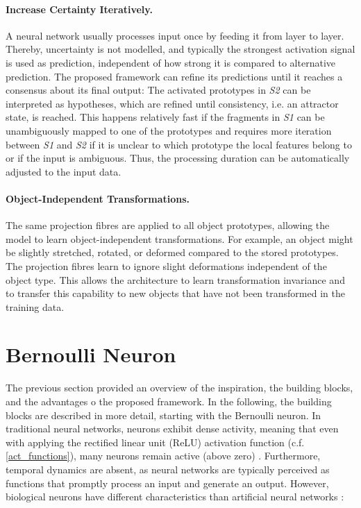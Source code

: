 \paragraph{Increase Certainty Iteratively.} A neural network usually processes input once by feeding it from layer to layer. Thereby, uncertainty is not modelled, and typically the strongest activation signal is used as prediction, independent of how strong it is compared to alternative prediction.
The proposed framework can refine its predictions until it reaches a consensus about its final output: The activated prototypes in \emph{S2} can be interpreted as hypotheses, which are refined until consistency, i.e. an attractor state, is reached. This happens relatively fast if the fragments in \emph{S1} can be unambiguously mapped to one of the prototypes and requires more iteration between \emph{S1} and \emph{S2} if it is unclear to which prototype the local features belong to or if the input is ambiguous. Thus, the processing duration can be automatically adjusted to the input data.

\paragraph{Object-Independent Transformations.} The same projection fibres are applied to all object prototypes, allowing the model to learn object-independent transformations. For example, an object might be slightly stretched, rotated, or deformed compared to the stored prototypes. The projection fibres learn to ignore slight deformations independent of the object type. This allows the architecture to learn transformation invariance and to transfer this capability to new objects that have not been transformed in the training data.


\section{Bernoulli Neuron}
The previous section provided an overview of the inspiration, the building blocks, and the advantages o the proposed framework. In the following, the building blocks are described in more detail, starting with the Bernoulli neuron.
In traditional neural networks, neurons exhibit dense activity, meaning that even with applying the rectified linear unit (ReLU) activation function (c.f. \eqref{act_functions}), many neurons remain active (above zero) . Furthermore, temporal dynamics are absent, as neural networks are typically perceived as functions that promptly process an input and generate an output. However, biological neurons have different characteristics than artificial neural networks :


